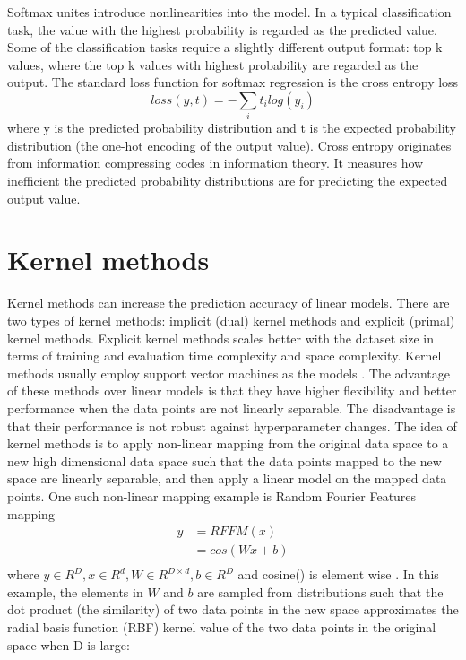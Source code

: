 \documentclass[12pt]{WSUThesis}
\theoremstyle{definition}
\begin{document}
Softmax unites introduce nonlinearities into the model.
In a typical classification task, the value with the highest probability is regarded as the predicted value.
Some of the classification tasks require a slightly different output format: top k values, where the top k values with highest probability are regarded as the output.
The standard loss function for softmax regression is the cross entropy loss
\[loss(y, t) = - \sum_i t_i log(y_i)\]
where y is the predicted probability distribution and t is the expected probability distribution (the one-hot encoding of the output value).
Cross entropy originates from information compressing codes in information theory.
It measures how inefficient the predicted probability distributions are for predicting the expected output value.

\section{Kernel methods}
Kernel methods can increase the prediction accuracy of linear models.
There are two types of kernel methods: implicit (dual) kernel methods and explicit (primal) kernel methods.
Explicit kernel methods scales better with the dataset size in terms of training and evaluation time complexity and space complexity.
Kernel methods usually employ support vector machines as the models \cite{hofmann2008kernel}.
The advantage of these methods over linear models is that they have higher flexibility and better performance when the data points are not linearly separable.
The disadvantage is that their performance is not robust against hyperparameter changes.
The idea of kernel methods is to apply non-linear mapping from the original data space to a new high dimensional data space such that the data points mapped to the new space are linearly separable, and then apply a linear model on the mapped data points.
One such non-linear mapping example is Random Fourier Features mapping
\begin{align*}
	y 
	&= RFFM(x) \\
	&= cos(Wx + b) \\
\end{align*}
where $ y \in R^D, x \in R^d, W \in R^{D \times d}, b \in R^D $ and cosine() is element wise \cite{rahimi2008random}.
In this example, the elements in $ W $ and $ b $ are sampled from distributions such that the dot product (the similarity) of two data points in the new space approximates the radial basis function (RBF) kernel value of the two data points in the original space when D is large:
\end{document}
